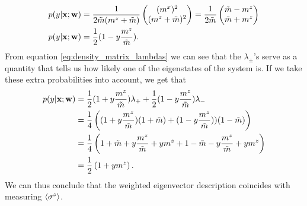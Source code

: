 \begin{align*}
p(y|\mathbf{x};\mathbf{w}) &= 
    \frac{1}{2\Tilde{m}(m^z + \Tilde{m})}
    \begin{pmatrix}
        (m^x)^2\\
        (m^z + \Tilde{m})^2
    \end{pmatrix} = 
    \frac{1}{2\Tilde{m}} 
    \begin{pmatrix}
        \Tilde{m} - m^z\\
        \Tilde{m} + m^z
    \end{pmatrix}\\
     p(y|\mathbf{x};\mathbf{w}) &= \frac{1}{2}(1 - y\frac{m^z}{\Tilde{m}}).
\end{align*}
From equation \ref{eq:density_matrix_lambdas} we can see that the $\lambda_\pm$'s serve as a quantity that tells us how likely one of the eigenstates of the system is. If we take these extra probabilities into account, we get that 
\begin{align*}
    p(y|\mathbf{x};\mathbf{w}) &= \frac{1}{2}(1+ y\frac{m^z}{\Tilde{m}}) \lambda_+ + \frac{1}{2}(1 - y \frac{m^z}{\Tilde{m}})\lambda_- \\
    &= \frac{1}{4}\left((1+ y\frac{m^z}{\Tilde{m}}) (1+\Tilde{m}) + (1 - y \frac{m^z}{\Tilde{m}})) (1-\Tilde{m})\right)\\
    &= \frac{1}{4}\left(1+ \Tilde{m}+y\frac{m^z}{\Tilde{m}}+y m^z + 1 - \Tilde{m} - y \frac{m^z}{\Tilde{m}} + y m^z\right)\\
    &= \frac{1}{2}\left(1+ y m^z\right).
\end{align*}
We can thus conclude that the weighted eigenvector description coincides with measuring $\expval{\sigma^{z}}$. \newline

